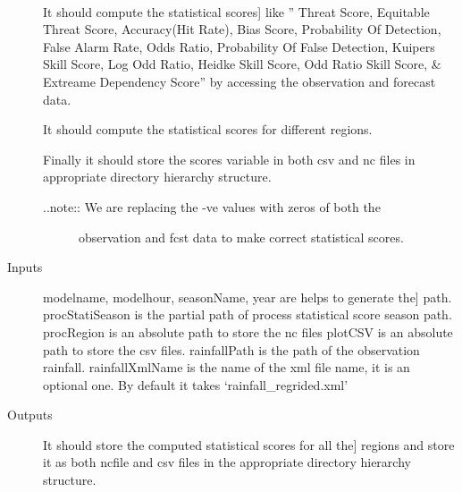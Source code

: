 \documentclass[letterpaper,10pt,english]{sphinxmanual}
\begin{document}
\begin{fulllineitems}
\label{diagnosis:compute_region_statistical_score.genStatisticalScore}~\begin{description}
\item[{}] \leavevmode{[}It should compute the statistical scores{]}
like '' Threat Score, Equitable Threat Score, Accuracy(Hit Rate),
Bias Score, Probability Of Detection, False Alarm Rate, Odds Ratio,
Probability Of False Detection, Kuipers Skill Score, Log Odd Ratio,
Heidke Skill Score, Odd Ratio Skill Score, \& Extreame Dependency Score''
by accessing the observation and forecast data.

It should compute the statistical scores for different regions.

Finally it should store the scores variable in both csv and nc files
in appropriate directory hierarchy structure.
\begin{description}
\item[{..note:: We are replacing the -ve values with zeros of both the}] \leavevmode
observation and fcst data to make correct statistical scores.

\end{description}

\item[{Inputs}] \leavevmode{[}modelname, modelhour, seasonName, year are helps to generate the{]}
path. procStatiSeason is the partial path of process statistical
score season path.
procRegion is an absolute path to store the nc files
plotCSV is an absolute path to store the csv files.
rainfallPath is the path of the observation rainfall.
rainfallXmlName is the name of the xml file name, it is an
optional one. By default it takes `rainfall\_regrided.xml'

\item[{Outputs}] \leavevmode{[}It should store the computed statistical scores for all the{]}
regions and store it as both ncfile and csv files in the
appropriate directory hierarchy structure.

\end{description}

\end{fulllineitems}
\end{document}
